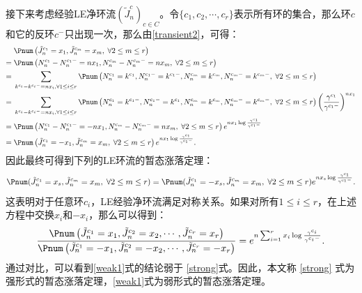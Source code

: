 接下来考虑经验LE净环流$(\tilde{J}^{c}_n)_{c\in C}$。令$\{c_1,c_2,\cdots,c_r\}$表示所有环的集合，那么环$c$和它的反环$c^-$只出现一次，那么由\ref{transient2}，可得：
\begin{align*}
    &\; \Pnum\left(\tilde{J}^{c_1}_n=x_1,\tilde{J}^{c_m}_n=x_m,\;\forall 2\le m \le r\right) \\
    =&\; \Pnum\left(N^{c_1}_n-N^{c_1-}_n=n x_1,N^{c_m}_n-N^{c_m-}_n=n x_m,\;\forall 2\le m \le r\right) \\
    =&\; \sum_{k^{c_i}-k^{c_i-}=n x_i,\forall 1\le i \le r} \Pnum\left(N^{c_1}_n=k^{c_1},N^{c_1-}_n=k^{c_1-},  N^{c_m}_n=k^{c_m},N^{c_m-}_n=k^{c_m-},\;\forall 2\le m \le r\right) \\
    =&\; \sum_{k^{c_i}-k^{c_i-}=n x_i,\forall 1\le i \le r} \Pnum\left(N^{c_1}_n=k^{c_1-},N^{c_1-}_n=k^{c_1}, N^{c_m}_n=k^{c_m},N^{c_m-}_n=k^{c_m-},\;\forall 2\le m \le r\right)\left(\frac{\gamma^{c_1}}{\gamma^{c_1-}}\right)^{n x_1}  \\
    =&\; \Pnum\left(N^{c_1}_n-N^{c_1-}_n=-n x_1, N^{c_m}_n-N^{c_m-}_n=n x_m,\;\forall 2\le m \le r\right) e^{n x_1 \log \frac{\gamma^{c_1}}{\gamma^{c_1-}}} \\
    =&\; \Pnum\left(\tilde{J}^{c_1}_n=-x_1,\tilde{J}^{c_m}_n=x_m,\;\forall 2\le m \le r\right) e^{n x_1 \log \frac{\gamma^{c_1}}{\gamma^{c_1-}}} .
\end{align*}
因此最终可得到下列的LE环流的暂态涨落定理：
\begin{equation}\label{strong}
    \Pnum(\tilde{J}^{c_1}_n=x_s,\tilde{J}^{c_m}_n=x_m,\;\forall 2\le m \le r) \\
    = \Pnum(\tilde{J}^{c_1}_n=-x_s,\tilde{J}^{c_m}_n=x_m,\;\forall 2\le m \le r)e^{nx_s\log\frac{\gamma^{c_1}}{\gamma^{c_1-}}}.
\end{equation}
这表明对于任意环$c_i$，LE经验净环流满足对称关系。如果对所有$1\le i \le r$，在上述方程中交换$x_i$和$-x_i$，那么可以得到：
\begin{equation}\label{weak1}
    \begin{split}
    \frac{\Pnum\left(\tilde{J}^{c_1}_n=x_1,\tilde{J}^{c_2}_n=x_2,\cdots,\tilde{J}^{c_{r}}_n=x_{r}\right)}
    {\Pnum\left(\tilde{J}^{c_1}_n=-x_1,\tilde{J}^{c_2}_n=-x_2,\cdots,\tilde{J}^{c_{r}}_n=-x_{r}\right)}
    =e^{n\sum_{i=1}^{r}x_i\log\frac{\gamma^{c_i}}{\gamma^{c_i-}}}.
    \end{split}
\end{equation}
通过对比，可以看到\eqref{weak1}式的结论弱于 \eqref{strong}式。因此，本文称 \eqref{strong} 式为强形式的暂态涨落定理，\eqref{weak1}式为弱形式的暂态涨落定理。

